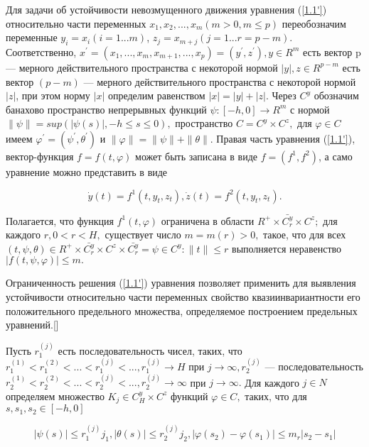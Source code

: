 	Для задачи об устойчивости невозмущенного движения уравнения (\ref{1.1'}) относительно части переменных $x_1, x_2, ... , x_m (m > 0, m \le p)$ переобозначим переменные $y_i = x_i (i = 1...m)$, $z_j = x_{m+j} (j = 1...r = p - m).$ Соответственно, $x^{'} = (x_1, ... , x_m, x_{m+1}, ..., x_p) = (y^{'}, z^{'}), y \in R^m$ есть вектор p --- мерного действительного пространства с некоторой нормой $|y|, z \in R^{p-m}$ есть вектор $(p-m)$ --- мерного действительного пространства с некоторой нормой $|z|$, при этом норму $|x|$ определим равенством $|x| = |y| + |z|.$ Через $C^y$ обозначим банахово пространство непрерывных функций $\psi : [-h, 0] \to R^m$ с нормой $\| \psi \| = sup(| \psi(s) |, -h \le s \le 0),$ пространство $C = C^y \times C^z,$ для $\varphi \in C$ имеем $\varphi^{'} = (\psi^{'}, \theta^{'})$ и $\| \varphi \| = \| \psi \| + \| \theta \|.$ Правая часть уравнения (\ref{1.1'}), вектор-функция $f = f(t, \varphi)$ может быть записана в виде $f = (f^1, f^2)$, а само уравнение можно представить в виде 
	
	\begin{equation}
	\dot y(t) = f^1(t, y_t, z_t), \dot z(t) = f^2(t, y_t, z_t).
	\end{equation}
	
	Полагается, что функция $f^1(t, \varphi)$ ограничена в области $R^+ \times \bar{C_r^y} \times C^z; $ для каждого $r, 0 < r < H,$ существует число $m = m(r) > 0,$ такое, что для всех $(t, \psi, \theta) \in R^+ \times \bar{C_r^y} \times C^z \times \bar{C_r^y} = {\psi \in C^y : \| t \| \le r}$ выполняется неравенство $| f(t, \psi, \varphi) |\le m .$

Ограниченность решения (\ref{1.1'}) уравнения позволяет применить для выявления устойчивости относительно части переменных свойство квазиинвариантности его положительного предельного множества, определяемое построением предельных уравнений.[]
	
	Пусть ${r^{(j)}_1}$ есть последовательность чисел, таких, что $r^{(1)}_1 < r^{(2)}_1 < ... < r^{(j)}_1 < ..., r^{(j)}_1 \to H $ при $j \to \infty, {r^{(j)}_2}$ --- последовательность $r^{(1)}_2 < r^{(2)}_2 < ... < r^{(j)}_2 < ..., r^{(j)}_2 \to \infty $ при $j \to \infty.$ Для каждого $j \in N$ определяем множество $K_j \in C^y_H \times C^z$ функций $\varphi \in C,$ таких, что для $s, s_1, s_2 \in [-h, 0]$
		
		\begin{equation}
		| \psi(s) | \le r^{(j)}_1 j_1, | \theta (s) | \le r^{(j)}_2 j_2, | \varphi(s_2) - \varphi(s_1) | \le m_r | s_2 - s_1 | 
		\end{equation}
		
